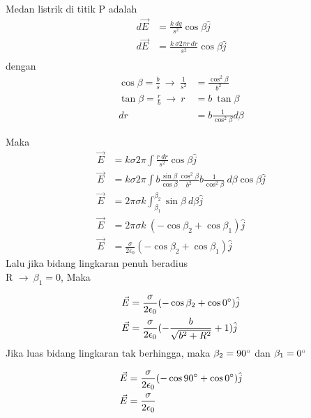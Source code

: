 \documentclass[twocolumn, 11pt]{article}%
\begin{document}
    Medan listrik di titik P adalah
    \begin{align*}
        d\vec E &= \frac{k\ dq}{s^2} \cos \beta \hat j\\
        d\vec E &= \frac{k\ \sigma2\pi r\ dr}{s^2} \cos \beta \hat j\\
    \end{align*}
    dengan
    \begin{align*}
        \cos \beta=\frac{b}s\ \rightarrow\ \frac1{s^2}&=\frac{\cos^2\beta}{b^2}\\
        \tan \beta= \frac{r}b\ \rightarrow\ r&=b\ \tan \beta\\
        dr&= b\frac1{\cos^2\beta} d\beta
    \end{align*}

    Maka
    \begin{align*}
        \vec E&=k\sigma2\pi \int \frac{r\ dr}{s^2} \cos \beta \hat j\\
        \vec E&=k\sigma2\pi \int b \frac{\sin \beta}{\cos \beta} \frac{\cos^2 \beta}{b^2} b \frac1{\cos^2\beta}\ d\beta \cos \beta \hat j\\
        \vec E&=2\pi\sigma k \int_{\beta_1}^{\beta_2} \sin \beta\ d \beta \hat j\\
        \vec E&=2\pi\sigma k\ (-\cos \beta_2 + \cos \beta_1)\hat j\\
        \vec E&= \frac{\sigma}{2\epsilon_0} (-\cos\beta_2 + \cos\beta_1)\hat j
    \end{align*}
    Lalu jika bidang lingkaran penuh beradius\\ R $\rightarrow\ \beta_1=0$,
    Maka

    \begin{align*}
        \vec E&= \frac{\sigma}{2\epsilon_0} (-\cos\beta_2 + \cos0\degree)\hat j\\
        \vec E&= \frac{\sigma}{2\epsilon_0} (- \frac{b}{\sqrt{b^2+R^2}} + 1)\hat j\\
    \end{align*}
    Jika luas bidang lingkaran tak berhingga, maka $\beta_2 = 90\degree$ dan $\beta_1=0\degree$

    \begin{align*}
        \vec E&= \frac{\sigma}{2\epsilon_0} (-\cos90\degree + \cos0\degree)\hat j\\
        \vec E &= \frac{\sigma}{2\epsilon_0}
    \end{align*}
\end{document}
